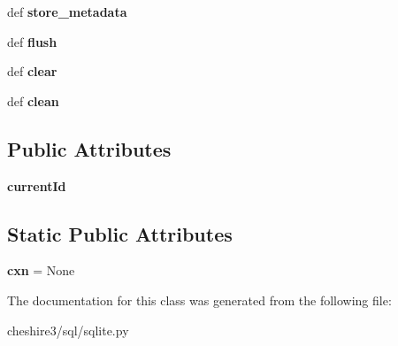 \begin{DoxyCompactItemize}
\item 
\hypertarget{classcheshire3_1_1sql_1_1sqlite_1_1_s_q_lite_store_a0f95a95681d215ac76ac9886c91563c3}{def {\bfseries store\-\_\-metadata}}\label{classcheshire3_1_1sql_1_1sqlite_1_1_s_q_lite_store_a0f95a95681d215ac76ac9886c91563c3}

\item 
\hypertarget{classcheshire3_1_1sql_1_1sqlite_1_1_s_q_lite_store_acff6896e260fd1d0bf366cca74f68269}{def {\bfseries flush}}\label{classcheshire3_1_1sql_1_1sqlite_1_1_s_q_lite_store_acff6896e260fd1d0bf366cca74f68269}

\item 
\hypertarget{classcheshire3_1_1sql_1_1sqlite_1_1_s_q_lite_store_ac9b414fd98d790287d27ab42c8ff6171}{def {\bfseries clear}}\label{classcheshire3_1_1sql_1_1sqlite_1_1_s_q_lite_store_ac9b414fd98d790287d27ab42c8ff6171}

\item 
\hypertarget{classcheshire3_1_1sql_1_1sqlite_1_1_s_q_lite_store_ad4485e6419167f0c2f4065e0981aa5b5}{def {\bfseries clean}}\label{classcheshire3_1_1sql_1_1sqlite_1_1_s_q_lite_store_ad4485e6419167f0c2f4065e0981aa5b5}

\end{DoxyCompactItemize}
\subsection*{Public Attributes}
\begin{DoxyCompactItemize}
\item 
\hypertarget{classcheshire3_1_1sql_1_1sqlite_1_1_s_q_lite_store_ac55e64802959171d0b65fd7dad7273c6}{{\bfseries current\-Id}}\label{classcheshire3_1_1sql_1_1sqlite_1_1_s_q_lite_store_ac55e64802959171d0b65fd7dad7273c6}

\end{DoxyCompactItemize}
\subsection*{Static Public Attributes}
\begin{DoxyCompactItemize}
\item 
\hypertarget{classcheshire3_1_1sql_1_1sqlite_1_1_s_q_lite_store_af654ed057dd7b2e722d6e8d5370d7a78}{{\bfseries cxn} = None}\label{classcheshire3_1_1sql_1_1sqlite_1_1_s_q_lite_store_af654ed057dd7b2e722d6e8d5370d7a78}

\end{DoxyCompactItemize}


The documentation for this class was generated from the following file\-:\begin{DoxyCompactItemize}
\item 
cheshire3/sql/sqlite.\-py\end{DoxyCompactItemize}
